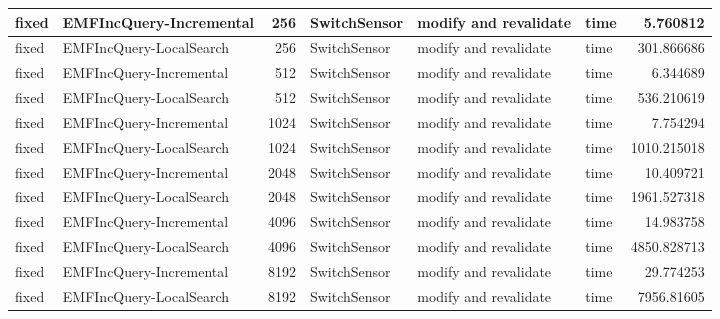 \begin{table}
\begin{tabular}{| l | l | r | l | l | l | r |}
fixed & EMFIncQuery-Incremental & 256 & SwitchSensor & modify and revalidate & time & 5.760812\\\hline
fixed & EMFIncQuery-LocalSearch & 256 & SwitchSensor & modify and revalidate & time & 301.866686\\\hline
fixed & EMFIncQuery-Incremental & 512 & SwitchSensor & modify and revalidate & time & 6.344689\\\hline
fixed & EMFIncQuery-LocalSearch & 512 & SwitchSensor & modify and revalidate & time & 536.210619\\\hline
fixed & EMFIncQuery-Incremental & 1024 & SwitchSensor & modify and revalidate & time & 7.754294\\\hline
fixed & EMFIncQuery-LocalSearch & 1024 & SwitchSensor & modify and revalidate & time & 1010.215018\\\hline
fixed & EMFIncQuery-Incremental & 2048 & SwitchSensor & modify and revalidate & time & 10.409721\\\hline
fixed & EMFIncQuery-LocalSearch & 2048 & SwitchSensor & modify and revalidate & time & 1961.527318\\\hline
fixed & EMFIncQuery-Incremental & 4096 & SwitchSensor & modify and revalidate & time & 14.983758\\\hline
fixed & EMFIncQuery-LocalSearch & 4096 & SwitchSensor & modify and revalidate & time & 4850.828713\\\hline
fixed & EMFIncQuery-Incremental & 8192 & SwitchSensor & modify and revalidate & time & 29.774253\\\hline
fixed & EMFIncQuery-LocalSearch & 8192 & SwitchSensor & modify and revalidate & time & 7956.81605\\\hline



\end{tabular}
\end{table}
